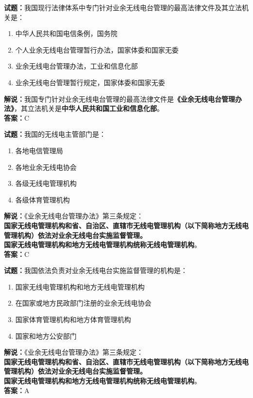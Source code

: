 \documentclass{ctexbook}
\begin{document}
\noindent\textbf{试题：}我国现行法律体系中专门针对业余无线电台管理的最高法律文件及其立法机关是：
\begin{enumerate}[leftmargin=3em]
  \item 中华人民共和国电信条例，国务院
  \item 个人业余无线电台管理暂行办法，国家体委和国家无委
  \item 业余无线电台管理办法，工业和信息化部
  \item 业余无线电台管理暂行规定，国家体委和国家无委
\end{enumerate}
\noindent\textbf{解说：}我国专门针对业余无线电台管理的最高法律文件是\textbf{《业余无线电台管理办法》}，其立法机关是\textbf{中华人民共和国工业和信息化部}。\\\noindent\textbf{答案：}C

\vspace{\baselineskip}

\noindent\textbf{试题：}我国的无线电主管部门是：
\begin{enumerate}[leftmargin=3em]
  \item 各地电信管理局
  \item 各地业余无线电协会
  \item 各级无线电管理机构
  \item 各级体育管理机构
\end{enumerate}
\noindent\textbf{解说：}《业余无线电台管理办法》第三条规定：\\\textbf{国家无线电管理机构和省、自治区、直辖市无线电管理机构（以下简称地方无线电管理机构）依法对业余无线电台实施监督管理。\\
  国家无线电管理机构和地方无线电管理机构统称无线电管理机构}。\\\noindent\textbf{答案：}C

\vspace{\baselineskip}

\noindent\textbf{试题：}我国依法负责对业余无线电台实施监督管理的机构是：
\begin{enumerate}[leftmargin=3em]
  \item 国家无线电管理机构和地方无线电管理机构
  \item 在国家或地方民政部门注册的业余无线电协会
  \item 国家体育管理机构和地方体育管理机构
  \item 国家和地方公安部门
\end{enumerate}
\noindent\textbf{解说：}《业余无线电台管理办法》第三条规定：\\\textbf{国家无线电管理机构和省、自治区、直辖市无线电管理机构（以下简称地方无线电管理机构）依法对业余无线电台实施监督管理。\\
  国家无线电管理机构和地方无线电管理机构统称无线电管理机构}。\\\noindent\textbf{答案：}A
\end{document}
